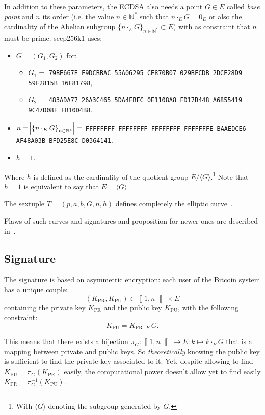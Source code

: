 \documentclass{IEEEtran}
\newcommand{\private}[1]{{#1}_{\text{PR}}}
\newcommand{\public}[1]{{#1}_{\text{PU}}}
\newcommand{\intint}[2]{\left\llbracket#1, #2\right\llbracket}
\begin{document}
	In addition to these parameters, the ECDSA also needs a point $G \in E$ called \textit{base point}
	and $n$ its order (i.e. the value $n \in \mathbb N^*$ such that $n \cdot_E G = 0_E$ or also the
	cardinality of the Abelian subgroup $\{n \cdot_E G\}_{n \in \mathbb N^*} \subset E$) with as
	constraint that $n$ must be prime. secp256k1 uses:
	\begin{itemize}
		\item $G = (G_1, G_2)$ for:
		\begin{itemize}
			\item $G_1 =$ \texttt{79BE667E F9DCBBAC 55A06295 CE870B07 029BFCDB 2DCE28D9 59F2815B 16F81798},
			\item $G_2 =$ \texttt{483ADA77 26A3C465 5DA4FBFC 0E1108A8 FD17B448 A6855419 9C47D08F FB10D4B8}.
		\end{itemize}
		\item $n = \abs {\left\{n \cdot_E G\right\}_{n \in \mathbb N^*}} =$ \texttt{FFFFFFFF FFFFFFFF FFFFFFFF
		FFFFFFFE BAAEDCE6 AF48A03B BFD25E8C D0364141}.
		\item $h = 1$.
	\end{itemize}

	Where $h$ is defined as the cardinality of the quotient group $E / \langle G \rangle$.\footnote{With $\langle G \rangle$
	denoting the subgroup generated by $G$.} Note that $h = 1$ is equivalent to say that $E = \langle G \rangle$

	The sextuple $T = (p, a, b, G, n, h)$ defines completely the elliptic curve~\cite{SEC2}.

	Flaws of such curves and signatures and proposition for newer ones are described in~\cite{Bernstein11, RFC8032}.

	\subsection{Signature}
	The signature is based on asymmetric encryption: each user of the Bitcoin system has a unique couple:
	\[(\private K, \public K) \in \intint 1n \times E\]
	containing the private key $\private K$ and the public key $\public K$, with the following constraint:
	\[\public K = \private K \cdot_E G.\]

	This means that there exists a bijection $\pi_G : \intint 1n \to E : k \mapsto k \cdot_E G$ that
	is a mapping between private and public keys. So \textit{theoretically} knowing the public key is
	sufficient to find the private key associated to it. Yet, despite allowing to find $\public K = \pi_G(\private K)$
	easily, the computational power doesn't allow yet to find easily $\private K = \pi_G^{-1}(\public K)$.
\end{document}
